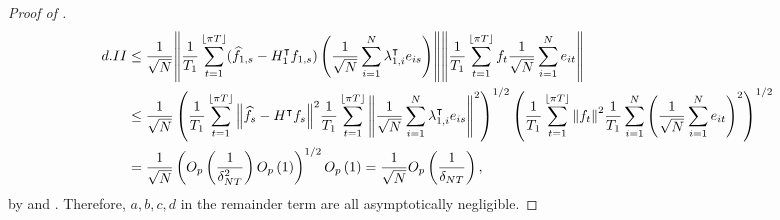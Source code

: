 \documentclass[12pt]{article}
\newcommand*{\tran}{\intercal}
\theoremstyle{plain}
\numberwithin{equation}{section}
\begin{document}
\begin{proof}[Proof of ]
\begin{align*}
d.II &\leq \frac{1}{\sqrt{N}}
\norm{
	\frac{1}{T_1} \sumTfloor (\widehat{f}_{1, s} - H_1^\tran f_{1, s}) 
	\left( \frac{1}{\sqrt{N}} \sumN \lambda_{1, i}^\tran e_{is}\right) 
} 
\norm{
	\frac{1}{T_1} \sumTfloor f_{t} \frac{1}{\sqrt{N}} \sumN e_{it}
} \\
&\leq 
\frac{1}{\sqrt{N}}
\left( 
	\frac{1}{T_1} \sumTfloor \norm{\widehat{f}_s - H^\tran f_s}^2
	\frac{1}{T_1} \sumTfloor \norm{\frac{1}{\sqrt{N}} \sumN \lambda_{1, i}^\tran e_{is}}^2
\right)^{1/2}
\left( 
	\frac{1}{T_1} \sumTfloor \norm{f_{t}}^2 
	\frac{1}{T_1} \sumN \left( \frac{1}{\sqrt{N}} \sumN e_{it}\right)^2 
\right)^{1/2} \\
&= \frac{1}{\sqrt{N}}
\left( \Opdeltasq \Op{1} \right)^{1/2} \Op{1} = \frac{1}{\sqrt{N}} \Opdelta,
\end{align*}
by  and .
Therefore, $a, b, c, d$ in the remainder term are all asymptotically negligible.
\end{proof}
\end{document}
